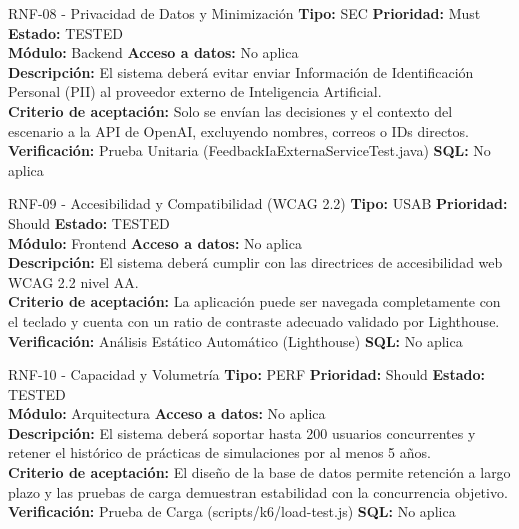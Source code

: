 \documentclass[11pt,a4paper]{article}
\begin{document}
\begin{requisito}{RNF-08 - Privacidad de Datos y Minimización}
    \textbf{Tipo:} SEC \quad \textbf{Prioridad:} Must \quad \textbf{Estado:} TESTED \\[0.2cm]
    \textbf{Módulo:} Backend \quad \textbf{Acceso a datos:} No aplica \\[0.2cm]
    \textbf{Descripción:} El sistema deberá evitar enviar Información de Identificación Personal (PII) al proveedor externo de Inteligencia Artificial. \\[0.2cm]
    \textbf{Criterio de aceptación:} Solo se envían las decisiones y el contexto del escenario a la API de OpenAI, excluyendo nombres, correos o IDs directos. \\[0.2cm]
    \textbf{Verificación:} Prueba Unitaria (FeedbackIaExternaServiceTest.java) \quad \textbf{SQL:} No aplica
\end{requisito}

\begin{requisito}{RNF-09 - Accesibilidad y Compatibilidad (WCAG 2.2)}
    \textbf{Tipo:} USAB \quad \textbf{Prioridad:} Should \quad \textbf{Estado:} TESTED \\[0.2cm]
    \textbf{Módulo:} Frontend \quad \textbf{Acceso a datos:} No aplica \\[0.2cm]
    \textbf{Descripción:} El sistema deberá cumplir con las directrices de accesibilidad web WCAG 2.2 nivel AA. \\[0.2cm]
    \textbf{Criterio de aceptación:} La aplicación puede ser navegada completamente con el teclado y cuenta con un ratio de contraste adecuado validado por Lighthouse. \\[0.2cm]
    \textbf{Verificación:} Análisis Estático Automático (Lighthouse) \quad \textbf{SQL:} No aplica
\end{requisito}

\begin{requisito}{RNF-10 - Capacidad y Volumetría}
    \textbf{Tipo:} PERF \quad \textbf{Prioridad:} Should \quad \textbf{Estado:} TESTED \\[0.2cm]
    \textbf{Módulo:} Arquitectura \quad \textbf{Acceso a datos:} No aplica \\[0.2cm]
    \textbf{Descripción:} El sistema deberá soportar hasta 200 usuarios concurrentes y retener el histórico de prácticas de simulaciones por al menos 5 años. \\[0.2cm]
    \textbf{Criterio de aceptación:} El diseño de la base de datos permite retención a largo plazo y las pruebas de carga demuestran estabilidad con la concurrencia objetivo. \\[0.2cm]
    \textbf{Verificación:} Prueba de Carga (scripts/k6/load-test.js) \quad \textbf{SQL:} No aplica
\end{requisito}
\end{document}
